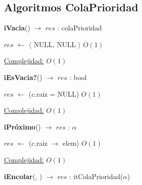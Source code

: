 \begin{Algoritmos}
\subsection{Algoritmos ColaPrioridad}


\begin{algorithm}[H]
{\textbf{iVacia}() $\to$ $res$ : colaPrioridad}
\begin{algorithmic}[1]
    \State $res$ $\gets$  $\langle$ NULL, NULL $\rangle$   \Comment $O(1)$

    \medskip
    \Statex \underline{Complejidad:} $O(1)$
\end{algorithmic}
\end{algorithm}


\begin{algorithm}[H]
{\textbf{iEsVacia?}() $\to$ $res$ : bool}
\begin{algorithmic}[1]
    \State $res$ $\gets$ ($c$.raiz = NULL) \Comment $O(1)$

    \medskip
    \Statex \underline{Complejidad:} $O(1)$
\end{algorithmic}
\end{algorithm}


\begin{algorithm}[H]
{\textbf{iPr\'oximo}() $\to$ $res$ : $\alpha$}
\begin{algorithmic}[1]
    \State $res$ $\gets$ ($c$.raiz $\rightarrow$ elem) \Comment $O(1)$

    \medskip
    \Statex \underline{Complejidad:} $O(1)$
\end{algorithmic}
\end{algorithm}


{\textbf{iEncolar}(, ) $\to$ $res$ : itColaPrioridad($\alpha$)}
\begin{algorithmic}[1]


\end{algorithmic}
\end{Algoritmos}
